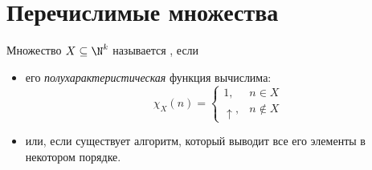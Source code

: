 \newpage
{}
\section{Перечислимые множества}

\begin{defn}
	Множество $ X \subseteq \N^{k}$ называется , если 
	\begin{itemize}
		\item его \textit{полухарактеристическая} функция вычислима:
		\[
			\chi_{X}(n) = \begin{cases}
				1, & n \in  X\\
				\uparrow, & n \notin X
			\end{cases}
		\] 
		\item 	или, если существует алгоритм, который выводит все его элементы в некотором порядке.
	\end{itemize}
\end{defn}


